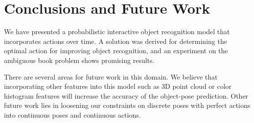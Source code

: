 \section{Conclusions and Future Work}

We have presented a probabilistic interactive object recognition model that incorporates actions over time.  A solution was derived for determining the optimal action for improving object recognition, and an experiment on the ambiguous book problem shows promising results.

    There are several areas for future work in this domain. We believe that incorporating other features into this model such as 3D point cloud or color histogram features will increase the accuracy of the object-pose prediction.
    Other future work lies in loosening our constraints on discrete poses with perfect actions into continuous poses and continuous actions. 

   